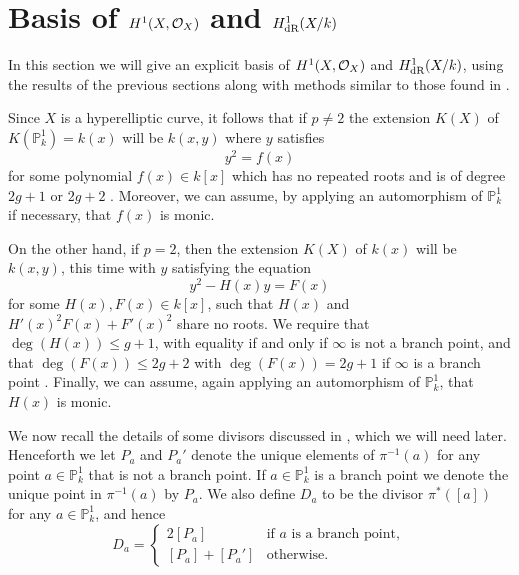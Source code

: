 \section{Basis of $H^1(X,\mathcal{O}_X)$ and $H_{\text {dR}}^1(X/k)$}

In this section we will give an explicit basis of $H^1(X,\mathcal{O}_X)$ and $H_{\text {dR}}^1(X/k)$, using the results of the previous sections along with methods similar to those found in \cite{canonicalrepresentation}.

Since $X$ is a hyperelliptic curve, it follows that if $p \neq 2$ the extension $K(X)$ of $K(\mathbb P_k^1) = k(x)$ will be $k(x,y)$ where $y$ satisfies
    \begin{equation}\label{definingequationpnot2}
    y^2 = f(x)
    \end{equation}
for some polynomial $f(x) \in k[x]$ which has no repeated roots and is of degree $2g+1$ or $2g+2$ \cite[Prop. 7.4.24]{liu}.
Moreover, we can assume, by applying an automorphism of $\mathbb P_k^1$ if necessary, that $f(x)$ is monic.

On the other hand, if $p=2$, then the extension $K(X)$ of $k(x)$ will be $k(x,y)$, this time with $y$ satisfying the equation
    \begin{equation}\label{definep=2}
    y^2 - H(x)y = F(x)
    \end{equation}
for some $H(x),F(x) \in k[x]$, such that $H(x)$ and $H'(x)^2F(x) + F'(x)^2$ share no roots.
We require that $\deg(H(x)) \leq g+1$, with equality if and only if $\infty$ is not a branch point, and that $\deg(F(x)) \leq 2g+2$ with $\deg(F(x)) = 2g+1$ if $\infty$ is a branch point  \cite[Prop. 7.4.24]{liu}.
Finally, we can assume, again applying an automorphism of $\mathbb P_k^1$, that $H(x)$ is monic.

We now recall the details of some divisors discussed in \cite{faithfulaction}, which we will need later.
Henceforth we let $P_a$ and $P_a'$ denote the unique elements of $\pi^{-1}(a)$ for any point $a \in \mathbb P_k^1$ that is not a branch point.
If $a \in \mathbb P_k^1$ is a branch point we denote the unique point in $\pi^{-1}(a)$ by $P_a$.
We also define $D_a$ to be the divisor $\pi^*\left([a]\right)$ for any $a \in \mathbb P_k^1$, and hence
    \begin{equation*}
    D_a= 
        \begin{cases}
         2[P_a] & \text{if $a$ is a branch point}, \\
         [P_a] + [P_a'] & \text{otherwise.}
        \end{cases}
    \end{equation*}

